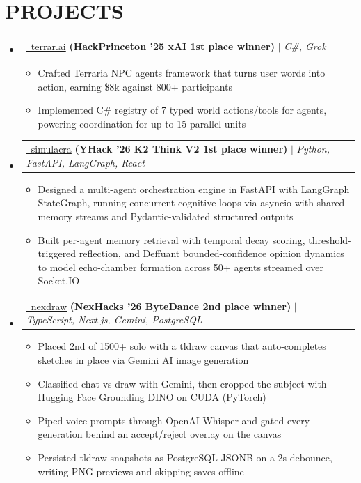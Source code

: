 \documentclass[letterpaper,11pt]{article}
\makeatletter
\newcommand{\resumeItem}[1]{
  \item\small{
    {#1 \vspace{-4pt}}
  }
}
\newcommand{\resumeProjectHeading}[2]{
    \item
    \begin{tabular*}{0.97\textwidth}[t]{l@{\extracolsep{\fill}}r}
      #1 & #2 \\
    \end{tabular*}\vspace{-7pt}
}
\newcommand{\resumeSubHeadingListStart}{\begin{itemize}[leftmargin=0.15in, label={}]}
\newcommand{\resumeSubHeadingListEnd}{\end{itemize}}
\newcommand{\resumeItemListStart}{\begin{itemize}}
\newcommand{\resumeItemListEnd}{\end{itemize}\vspace{-6pt}}
\makeatother
\begin{document}
\section{\textbf{PROJECTS}}
    \resumeSubHeadingListStart
    \resumeProjectHeading
  {\textcolor{linkblue}{\underline{\faGithub\ terrar.ai}} \textbf{(HackPrinceton '25 xAI 1st place winner)}
  $|$
  \emph{C\#, Grok}
  }
  {}
  \resumeItemListStart
    \resumeItem{Crafted Terraria NPC agents framework that turns user words into action, earning \$8k against 800+ participants}
    \resumeItem{Implemented C\# registry of 7 typed world actions/tools for agents, powering coordination for up to 15 parallel units}
  \resumeItemListEnd
     \resumeProjectHeading
  {\textcolor{linkblue}{\underline{\faGithub\ simulacra}} \textbf{(YHack '26 K2 Think V2 1st place winner)}
  $|$
  \emph{Python, FastAPI, LangGraph, React}
  }{}
  \resumeItemListStart
    \resumeItem{Designed a multi-agent orchestration engine in FastAPI with LangGraph StateGraph, running concurrent cognitive loops via asyncio with shared memory streams and Pydantic-validated structured outputs}
    \resumeItem{Built per-agent memory retrieval with temporal decay scoring, threshold-triggered reflection, and Deffuant bounded-confidence opinion dynamics to model echo-chamber formation across 50+ agents streamed over Socket.IO}
  \resumeItemListEnd
    \resumeProjectHeading
  {\textcolor{linkblue}{\underline{\faGithub\ nexdraw}} \textbf{(NexHacks '26 ByteDance 2nd place winner)}
  $|$
  \emph{TypeScript, Next.js, Gemini, PostgreSQL}
  }
  {}
  \resumeItemListStart
    \resumeItem{Placed 2nd of 1500+ solo with a tldraw canvas that auto-completes sketches in place via Gemini AI image generation}
    \resumeItem{Classified chat vs draw with Gemini, then cropped the subject with Hugging Face Grounding DINO on CUDA (PyTorch)}
    \resumeItem{Piped voice prompts through OpenAI Whisper and gated every generation behind an accept/reject overlay on the canvas}
    \resumeItem{Persisted tldraw snapshots as PostgreSQL JSONB on a 2s debounce, writing PNG previews and skipping saves offline}
  \resumeItemListEnd
    \resumeSubHeadingListEnd

\end{document}
